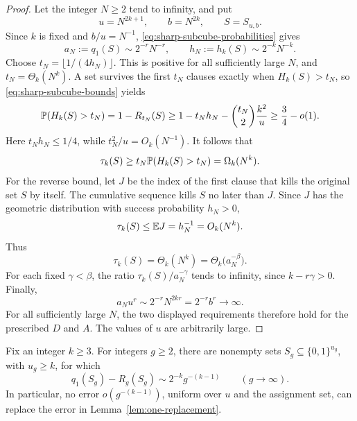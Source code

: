 \begin{proof}
Let the integer \(N\ge2\) tend to infinity, and put
\[
 u=N^{2k+1},\qquad b=N^{2k},\qquad S=S_{u,b}.
\]
Since \(k\) is fixed and \(b/u=N^{-1}\),
\eqref{eq:sharp-subcube-probabilities} gives
\begin{equation}\label{eq:sharp-frozen-probabilities}
 a_N:=q_1(S)\sim 2^{-r}N^{-r},
 \qquad h_N:=h_k(S)\sim 2^{-k}N^{-k}.
\end{equation}
Choose \(t_N=\lfloor1/(4h_N)\rfloor\).  This is positive for all
sufficiently large \(N\), and \(t_N=\Theta_k(N^k)\).  A set survives
the first \(t_N\) clauses exactly when \(H_k(S)>t_N\), so
\eqref{eq:sharp-subcube-bounds} yields
\begin{equation}\label{eq:sharp-survival}
 \mathbb P(H_k(S)>t_N)
 =1-R_{t_N}(S)
 \ge 1-t_Nh_N-\binom{t_N}{2}\frac{k^2}{u}
 \ge\frac34-o(1).
\end{equation}
Here \(t_Nh_N\le1/4\), while \(t_N^2/u=O_k(N^{-1})\).
It follows that
\[
 \tau_k(S)\ge t_N\mathbb P(H_k(S)>t_N)=\Omega_k(N^k).
\]
For the reverse bound, let \(J\) be the index of the first clause that
kills the original set \(S\) by itself.  The cumulative sequence kills \(S\)
no later than \(J\).  Since \(J\) has the geometric distribution with
success probability \(h_N>0\),
\[
 \tau_k(S)\le\mathbb E J=h_N^{-1}=O_k(N^k).
\]
Thus
\[
 \tau_k(S)=\Theta_k(N^k)
          =\Theta_k\bigl(a_N^{-\beta}\bigr).
\]
For each fixed \(\gamma<\beta\), the ratio
\(\tau_k(S)/a_N^{-\gamma}\) tends to infinity, since
\(k-r\gamma>0\).  Finally,
\[
 a_Nu^r\sim 2^{-r}N^{2kr}=2^{-r}b^r\longrightarrow\infty.
\]
For all sufficiently large \(N\), the two displayed requirements
therefore hold for the prescribed \(D\) and \(A\).  The values of \(u\)
are arbitrarily large.
\end{proof}

\begin{proposition}
\label{prop:replacement-sharp}
Fix an integer \(k\ge3\).  For integers \(g\ge2\), there are nonempty
sets \(S_g\subseteq\{0,1\}^{u_g}\), with \(u_g\ge k\), for which
\[
 q_1(S_g)-R_g(S_g)\sim 2^{-k}g^{-(k-1)}
 \qquad(g\to\infty).
\]
In particular, no error \(o(g^{-(k-1)})\), uniform over \(u\) and the
assignment set, can replace the error in
Lemma~\ref{lem:one-replacement}.
\end{proposition}

